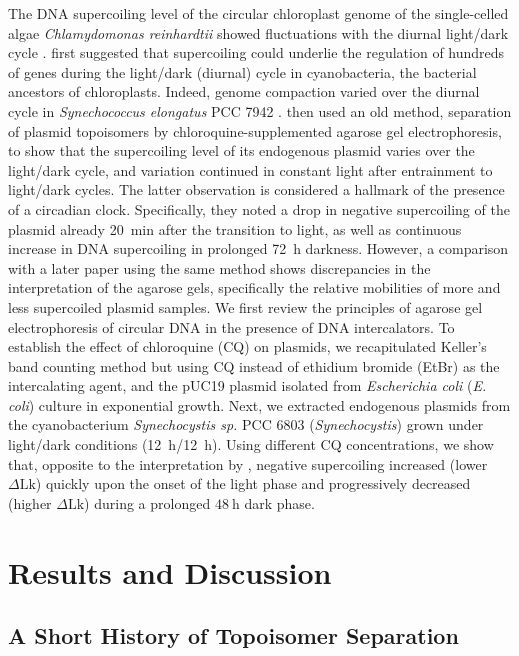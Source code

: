 \documentclass[10pt,a4]{article}
\def\cite#1{\hypersetup{citecolor=Teal}\citep{#1}} %
\newcommand{\scyst}{\textit{Synechocystis}}
\newcommand{\dlk}{\ensuremath{\Delta\text{Lk}}}
\begin{document}
%
The DNA supercoiling level of the circular chloroplast genome of the
single-celled algae \textit{Chlamydomonas reinhardtii} showed
fluctuations with the diurnal light/dark cycle \cite{Salvador1998}.
\citet{Mori2001} first suggested that supercoiling could underlie the
regulation of hundreds of genes during the light/dark (diurnal) cycle
in cyanobacteria, the bacterial ancestors of chloroplasts. Indeed,
genome compaction varied over the diurnal cycle in
\textit{Synechococcus elongatus} PCC 7942
\cite{Smith2006}. \citet{Woelfle2007} then used an old method,
separation of plasmid topoisomers by chloroquine-supplemented agarose
gel electrophoresis, to show that the supercoiling level of its
endogenous plasmid varies over the light/dark cycle, and variation
continued in constant light after entrainment to light/dark
cycles. The latter observation is considered a hallmark of the
presence of a circadian clock.  Specifically, they noted a drop in
negative supercoiling of the plasmid already \SI{20}{\minute} after
the transition to light, as well as continuous increase in DNA
supercoiling in prolonged \SI{72}{\hour} darkness. However, a
comparison with a later paper using the same method \cite{Vijayan2009}
shows discrepancies in the interpretation of the agarose gels,
specifically the relative mobilities of more and less supercoiled
plasmid samples.
%
We first review the principles of agarose gel electrophoresis of
circular DNA in the presence of DNA intercalators.  To establish the
effect of chloroquine (CQ) on plasmids, we recapitulated Keller's band
counting method but using CQ instead of ethidium bromide (EtBr) as the
intercalating agent, and the pUC19 plasmid isolated from
\textit{Escherichia coli} (\textit{E. coli}) culture in exponential
growth. Next, we extracted endogenous plasmids from the cyanobacterium
\textit{Synechocystis sp.}  PCC 6803 (\scyst{}) grown under light/dark
conditions (\SI{12}{\hour}/\SI{12}{\hour}). Using different CQ
concentrations, we show that, opposite to the interpretation by
\citet{Woelfle2007}, negative supercoiling increased (lower $\dlk$)
quickly upon the onset of the light phase and progressively decreased
(higher $\dlk$) during a prolonged $\SI{48}{\hour}$ dark phase.

\section{Results and Discussion}

\subsection{A Short History of Topoisomer Separation}
\end{document}
